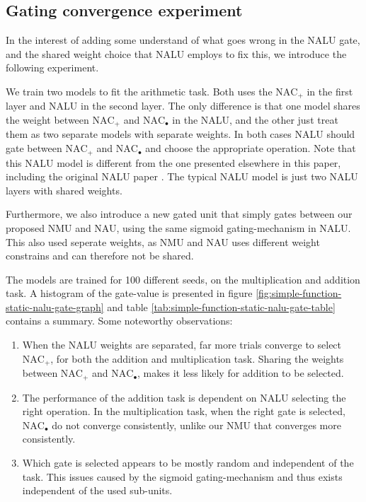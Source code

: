 \subsection{Gating convergence experiment}
\label{sec:appendix:nalu-gate-experiment}

In the interest of adding some understand of what goes wrong in the NALU gate, and the shared weight choice that NALU employs to fix this, we introduce the following experiment.

We train two models to fit the arithmetic task. Both uses the $\mathrm{NAC}_{+}$ in the first layer and NALU in the second layer. The only difference is that one model shares the weight between $\mathrm{NAC}_{+}$ and $\mathrm{NAC}_{\bullet}$ in the NALU, and the other just treat them as two separate models with separate weights. In both cases NALU should gate between $\mathrm{NAC}_{+}$ and $\mathrm{NAC}_{\bullet}$ and choose the appropriate operation. Note that this NALU model is different from the one presented elsewhere in this paper, including the original NALU paper \cite{trask-nalu}. The typical NALU model is just two NALU layers with shared weights.

Furthermore, we also introduce a new gated unit that simply gates between our proposed NMU and NAU, using the same sigmoid gating-mechanism in NALU. This also used seperate weights, as NMU and NAU uses different weight constrains and can therefore not be shared.

The models are trained for 100 different seeds, on the multiplication and addition task. A histogram of the gate-value is presented in figure \ref{fig:simple-function-static-nalu-gate-graph} and table \ref{tab:simple-function-static-nalu-gate-table} contains a summary. Some noteworthy observations:

\vspace{-0.3cm}\begin{enumerate}
    \item When the NALU weights are separated, far more trials converge to select $\mathrm{NAC}_{+}$, for both the addition and multiplication task. Sharing the weights between $\mathrm{NAC}_{+}$ and $\mathrm{NAC}_{\bullet}$, makes it less likely for addition to be selected. 
    \item The performance of the addition task is dependent on NALU selecting the right operation. In the multiplication task, when the right gate is selected, $\mathrm{NAC}_{\bullet}$ do not converge consistently, unlike our NMU that converges more consistently.
    \item Which gate is selected appears to be mostly random and independent of the task. This issues caused by the sigmoid gating-mechanism and thus exists independent of the used sub-units.
\end{enumerate}

